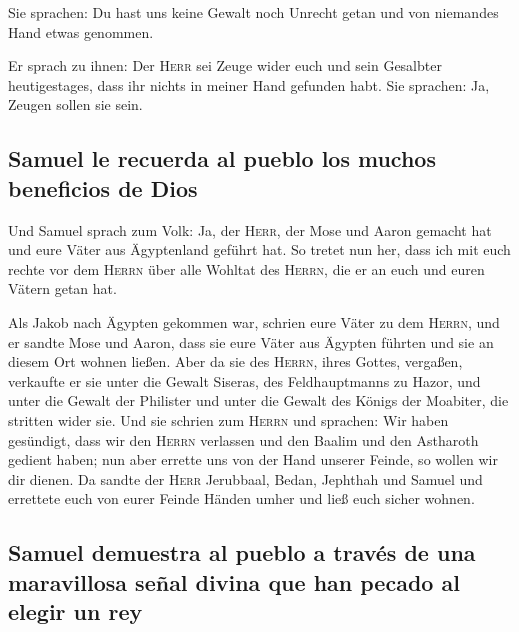  Sie sprachen: Du hast uns keine Gewalt noch Unrecht getan
und von niemandes Hand etwas genommen.

 Er sprach zu ihnen: Der \textsc{Herr} sei Zeuge wider
euch und sein Gesalbter heutigestages, dass ihr nichts in meiner Hand
gefunden habt. Sie sprachen: Ja, Zeugen sollen sie sein.

\hypertarget{samuel-le-recuerda-al-pueblo-los-muchos-beneficios-de-dios}{%
\subsection{Samuel le recuerda al pueblo los muchos beneficios de
Dios}\label{samuel-le-recuerda-al-pueblo-los-muchos-beneficios-de-dios}}

 Und Samuel sprach zum Volk: Ja, der \textsc{Herr}, der
Mose und Aaron gemacht hat und eure Väter aus Ägyptenland geführt hat.
 So tretet nun her, dass ich mit euch rechte vor dem
\textsc{Herrn} über alle Wohltat des \textsc{Herrn}, die er an euch und
euren Vätern getan hat.

 Als Jakob nach Ägypten gekommen war, schrien eure Väter
zu dem \textsc{Herrn}, und er sandte Mose und Aaron, dass sie eure Väter
aus Ägypten führten und sie an diesem Ort wohnen ließen. 
Aber da sie des \textsc{Herrn}, ihres Gottes, vergaßen, verkaufte er sie
unter die Gewalt Siseras, des Feldhauptmanns zu Hazor, und unter die
Gewalt der Philister und unter die Gewalt des Königs der Moabiter, die
stritten wider sie.  Und sie schrien zum \textsc{Herrn}
und sprachen: Wir haben gesündigt, dass wir den \textsc{Herrn} verlassen
und den Baalim und den Astharoth gedient haben; nun aber errette uns von
der Hand unserer Feinde, so wollen wir dir dienen.  Da
sandte der \textsc{Herr} Jerubbaal, Bedan, Jephthah und Samuel und
errettete euch von eurer Feinde Händen umher und ließ euch sicher
wohnen.

\hypertarget{samuel-demuestra-al-pueblo-a-travuxe9s-de-una-maravillosa-seuxf1al-divina-que-han-pecado-al-elegir-un-rey}{%
\subsection{Samuel demuestra al pueblo a través de una maravillosa señal
divina que han pecado al elegir un
rey}\label{samuel-demuestra-al-pueblo-a-travuxe9s-de-una-maravillosa-seuxf1al-divina-que-han-pecado-al-elegir-un-rey}}

